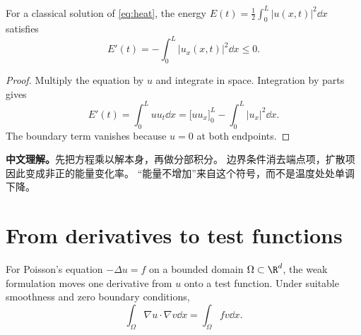 \begin{marginfigure}
  \caption{A decaying sine mode. 振幅随时间衰减。}\label{fig:mode}
\end{marginfigure}
\begin{theorem}\label{thm:energy}
For a classical solution of \eqref{eq:heat}, the energy
$E(t)=\frac12\int_0^L |u(x,t)|^2\dd x$ satisfies
\[
  E'(t)=-\int_0^L |u_x(x,t)|^2\dd x\leq 0.
\]
\end{theorem}
\begin{proof}
Multiply the equation by $u$ and integrate in space. Integration by
parts gives
\[
  E'(t)=\int_0^L u u_t\dd x
  =\bigl[u u_x\bigr]_0^L-\int_0^L |u_x|^2\dd x.
\]
The boundary term vanishes because $u=0$ at both endpoints.
\end{proof}
\begin{translationbox}
\textbf{中文理解。}先把方程乘以解本身，再做分部积分。
边界条件消去端点项，扩散项因此变成非正的能量变化率。
“能量不增加”来自这个符号，而不是温度处处单调下降。
\end{translationbox}

\newpage
\section{From derivatives to test functions}
For Poisson's equation $-\Delta u=f$ on a bounded domain
$\Omega\subset\R^d$, the weak formulation moves one derivative from
$u$ onto a test function.
Under suitable smoothness and zero boundary conditions,
\begin{equation}\label{eq:weak}
  \int_\Omega \nabla u\cdot\nabla v\dd x
  =\int_\Omega fv\dd x.
\end{equation}

